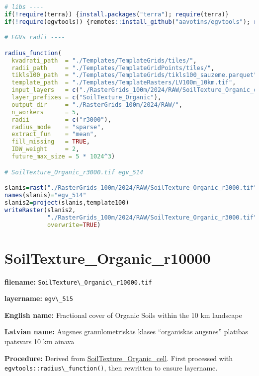 \documentclass[
]{book}
\newcommand{\passthrough}[1]{#1}
\begin{document}
\begin{lstlisting}[language=R]
# libs ----
if(!require(terra)) {install.packages("terra"); require(terra)}
if(!require(egvtools)) {remotes::install_github("aavotins/egvtools"); require(egvtools)}

# EGVs radii ----

radius_function(
  kvadrati_path  = "./Templates/TemplateGrids/tiles/",
  radii_path     = "./Templates/TemplateGridPoints/tiles/",
  tikls100_path  = "./Templates/TemplateGrids/tikls100_sauzeme.parquet",
  template_path  = "./Templates/TemplateRasters/LV100m_10km.tif",
  input_layers   = c("./RasterGrids_100m/2024/RAW/SoilTexture_Organic_cell.tif"),
  layer_prefixes = c("SoilTexture_Organic"),
  output_dir     = "./RasterGrids_100m/2024/RAW/",
  n_workers      = 5,
  radii          = c("r3000"),
  radius_mode    = "sparse",
  extract_fun    = "mean",
  fill_missing   = TRUE,
  IDW_weight     = 2,
  future_max_size = 5 * 1024^3)

# SoilTexture_Organic_r3000.tif egv_514

slanis=rast("./RasterGrids_100m/2024/RAW/SoilTexture_Organic_r3000.tif")
names(slanis)="egv_514"
slanis2=project(slanis,template100)
writeRaster(slanis2,
            "./RasterGrids_100m/2024/RAW/SoilTexture_Organic_r3000.tif",
            overwrite=TRUE)
\end{lstlisting}

\section{SoilTexture\_Organic\_r10000}\label{ch06.515}

\textbf{filename:} \passthrough{\lstinline!SoilTexture\_Organic\_r10000.tif!}

\textbf{layername:} \passthrough{\lstinline!egv\_515!}

\textbf{English name:} Fractional cover of Organic Soils within the 10 km landscape

\textbf{Latvian name:} Augsnes granulometriskās klases ``organiskās augsnes'' platības īpatsvars 10 km ainavā

\textbf{Procedure:} Derived from \hyperref[ch06.511]{SoilTexture\_Organic\_cell}. First processed
with \passthrough{\lstinline!egvtools::radius\_function()!}, then rewritten to ensure layername.
\end{document}
